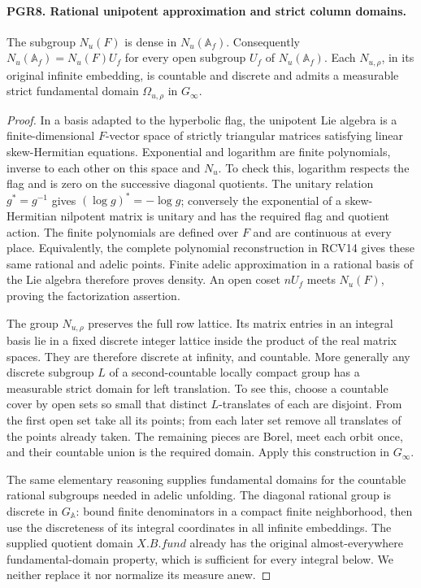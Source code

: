 \documentclass[11pt,a4paper]{article}
\numberwithin{equation}{section}
\theoremstyle{remark}\newtheorem{remark}[theorem]{Remark}
\begin{document}
\paragraph{PGR8. Rational unipotent approximation and strict column domains.}
\label{claim:PGR8}
The subgroup \(N_u(F)\) is dense in \(N_u(\mathbb A_f)\).
Consequently \(N_u(\mathbb A_f)=N_u(F)U_f\) for every open
subgroup \(U_f\) of \(N_u(\mathbb A_f)\).  Each
\(N_{u,\rho}\), in its original infinite embedding, is countable
and discrete and admits a measurable strict fundamental domain
\(\Omega_{u,\rho}\) in \(G_\infty\).
\begin{proof}
In a basis adapted to the hyperbolic flag, the unipotent Lie algebra
is a finite-dimensional \(F\)-vector space of strictly triangular
matrices satisfying linear skew-Hermitian equations.  Exponential
and logarithm are finite polynomials, inverse to each other on this
space and \(N_u\).  To check this, logarithm respects the flag and
is zero on the successive diagonal quotients.  The unitary relation
\(g^*=g^{-1}\) gives \((\log g)^*=-\log g\); conversely the
exponential of a skew-Hermitian nilpotent matrix is unitary and has
the required flag and quotient action.  The finite polynomials are
defined over \(F\) and are continuous at every place.
Equivalently, the complete polynomial reconstruction
in RCV14 gives these same rational and adelic points.  Finite adelic
approximation in a rational basis of the Lie algebra therefore proves
density.  An open coset \(nU_f\) meets \(N_u(F)\), proving the
factorization assertion.

The group \(N_{u,\rho}\) preserves the full row lattice.
Its matrix entries in an integral basis lie in a fixed discrete
integer lattice inside the product of the real matrix spaces.
They are therefore discrete at infinity, and countable.  More
generally any discrete subgroup \(L\) of a second-countable locally
compact group has a measurable strict domain for left translation.
To see this, choose a countable cover by open sets so small that
distinct \(L\)-translates of each are disjoint.  From the first
open set take all its points; from each later set remove all translates
of the points already taken.  The remaining pieces are Borel, meet
each orbit once, and their countable union is the required domain.
Apply this construction in \(G_\infty\).

The same elementary reasoning supplies fundamental domains for the
countable rational subgroups needed in adelic unfolding.  The
diagonal rational group is discrete in \(G_{\mathbb A}\): bound
finite denominators in a compact finite neighborhood, then use the
discreteness of its integral coordinates in all infinite embeddings.
The supplied quotient domain \(X.B.fund\) already has the original
almost-everywhere fundamental-domain property, which is sufficient
for every integral below.  We neither replace it nor normalize its
measure anew.
\end{proof}
\end{document}
